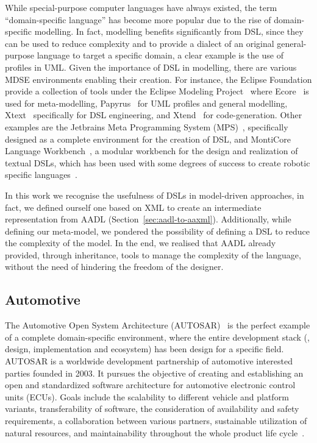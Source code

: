 While special-purpose computer languages have always existed, the term ``domain-specific language'' has become more popular due to the rise of domain-specific modelling. In fact, modelling benefits significantly from DSL, since they can be used to reduce complexity and to provide a dialect of an original general-purpose language to target a specific domain, a clear example is the use of profiles in UML. Given the importance of DSL in modelling, there are various MDSE environments enabling their creation. For instance, the Eclipse Foundation provide a collection of tools under the Eclipse Modeling Project~\cite{gronback2009eclipse} where Ecore~\cite{steinberg2008emf, sciamma2013ecore} is used for meta-modelling, Papyrus~\cite{lanusse2009papyrus} for UML profiles and general modelling, Xtext~\cite{eysholdt2010xtext} specifically for DSL engineering, and Xtend~\cite{bettini2016implementing} for code-generation. Other examples are the Jetbrains Meta Programming System (MPS)~\cite{mps}, specifically designed as a complete environment for the creation of DSL, and MontiCore Language Workbench~\cite{krahn2010monticore}, a modular workbench for the design and realization of textual DSLs, which has been used with some degrees of success to create robotic specific languages~\cite{thomas2013new}.

In this work we recognise the usefulness of DSLs in model-driven approaches, in fact, we defined ourself one based on XML to create an intermediate representation from AADL (Section~\ref{sec:aadl-to-aaxml}). Additionally, while defining our meta-model, we pondered the possibility of defining a DSL to reduce the complexity of the model. In the end, we realised that AADL already provided, through inheritance, tools to manage the complexity of the language, without the need of  hindering the freedom of the designer.

\subsection{Automotive}
The Automotive Open System Architecture (AUTOSAR)~\cite{furst2009autosar} is the perfect example of a complete domain-specific environment, where the entire development stack (\ie, design, implementation and ecosystem) has been design for a specific field. AUTOSAR is a worldwide development partnership of automotive interested parties founded in 2003. It pursues the objective of creating and establishing an open and standardized software architecture for automotive electronic control units (ECUs). Goals include the scalability to different vehicle and platform variants, transferability of software, the consideration of availability and safety requirements, a collaboration between various partners, sustainable utilization of natural resources, and maintainability throughout the whole product life cycle~\cite{autosar}.

